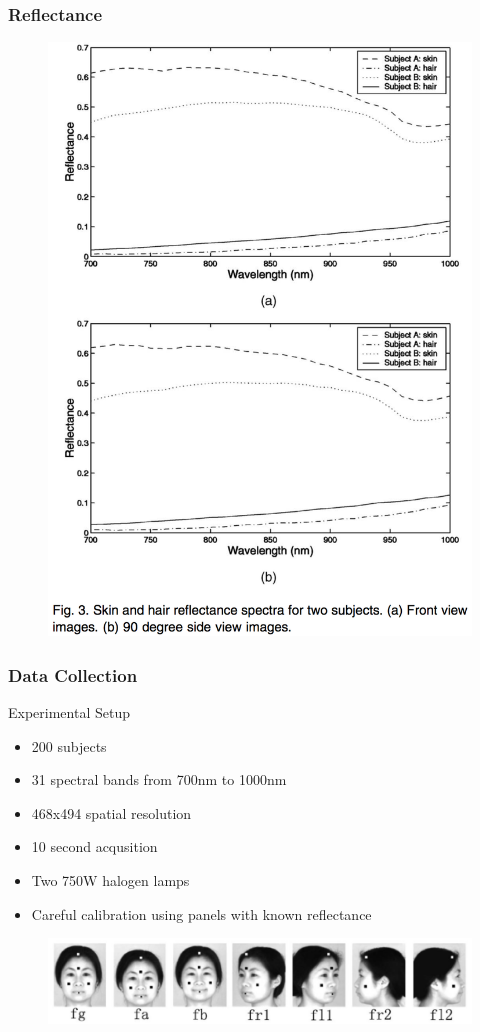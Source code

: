 \documentclass{beamer}
\begin{document}
\begin{frame}
\frametitle{Reflectance}
\begin{figure}
\includegraphics[height=0.8\textheight]{2subjects}
\end{figure}
\end{frame}

\begin{frame}
\frametitle{Data Collection}
\begin{block}{Experimental Setup}
\begin{itemize}
\item 200 subjects
\item 31 spectral bands from 700nm to 1000nm
\item 468x494 spatial resolution
\item 10 second acqusition
\item Two 750W halogen lamps
\item Careful calibration using panels with known reflectance
\end{itemize}
\begin{figure}
\includegraphics[width=\textwidth]{7poses}
\end{figure}
\end{block}
\end{frame}
\end{document}
